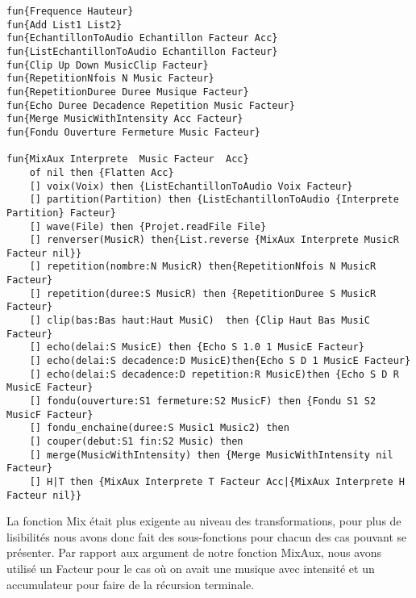 \documentclass[a4paper,12pt]{report}
\begin{document}
\begin{lstlisting}[frame=single] 
fun{Frequence Hauteur}
fun{Add List1 List2}
fun{EchantillonToAudio Echantillon Facteur Acc}
fun{ListEchantillonToAudio Echantillon Facteur}
fun{Clip Up Down MusicClip Facteur}
fun{RepetitionNfois N Music Facteur}
fun{RepetitionDuree Duree Musique Facteur}
fun{Echo Duree Decadence Repetition Music Facteur}
fun{Merge MusicWithIntensity Acc Facteur}
fun{Fondu Ouverture Fermeture Music Facteur}

fun{MixAux Interprete  Music Facteur  Acc}
	of nil then {Flatten Acc}
	[] voix(Voix) then {ListEchantillonToAudio Voix Facteur}
	[] partition(Partition) then {ListEchantillonToAudio {Interprete Partition} Facteur}
	[] wave(File) then {Projet.readFile File}
	[] renverser(MusicR) then{List.reverse {MixAux Interprete MusicR Facteur nil}}
	[] repetition(nombre:N MusicR) then{RepetitionNfois N MusicR Facteur}
	[] repetition(duree:S MusicR) then {RepetitionDuree S MusicR Facteur}
	[] clip(bas:Bas haut:Haut MusiC)  then {Clip Haut Bas MusiC Facteur}
	[] echo(delai:S MusicE) then {Echo S 1.0 1 MusicE Facteur}
	[] echo(delai:S decadence:D MusicE)then{Echo S D 1 MusicE Facteur}
	[] echo(delai:S decadence:D repetition:R MusicE)then {Echo S D R MusicE Facteur}
	[] fondu(ouverture:S1 fermeture:S2 MusicF) then {Fondu S1 S2 MusicF Facteur}
	[] fondu_enchaine(duree:S Music1 Music2) then
	[] couper(debut:S1 fin:S2 Music) then
	[] merge(MusicWithIntensity) then {Merge MusicWithIntensity nil Facteur}
	[] H|T then {MixAux Interprete T Facteur Acc|{MixAux Interprete H Facteur nil}}
\end{lstlisting}
La fonction Mix était plus exigente au niveau des transformations, pour plus de lisibilités nous avons donc fait des sous-fonctions pour chacun des cas pouvant se présenter. 
Par rapport aux argument de notre fonction MixAux, nous avons utilisé un Facteur pour le cas où on avait une musique avec intensité et un accumulateur pour faire de la récursion terminale.
\end{document}
